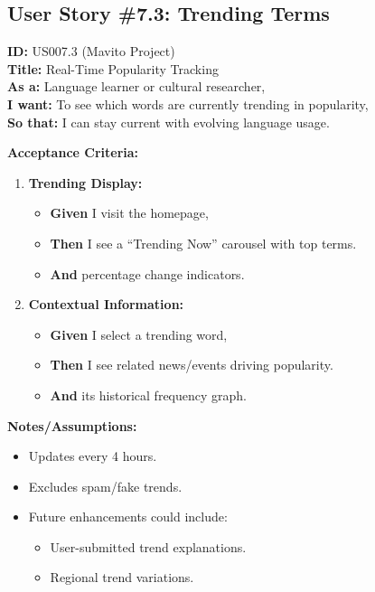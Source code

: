 \documentclass[12pt]{article}
\begin{document}
\subsection{User Story \#7.3: Trending Terms}

\textbf{ID:} US007.3 (Mavito Project) \\
\textbf{Title:} Real-Time Popularity Tracking \\
\textbf{As a:} Language learner or cultural researcher, \\
\textbf{I want:} To see which words are currently trending in popularity, \\
\textbf{So that:} I can stay current with evolving language usage.

\vspace{1em}
\textbf{Acceptance Criteria:}
\begin{enumerate}
    \item \textbf{Trending Display:}
    \begin{itemize}
        \item \textbf{Given} I visit the homepage,
        \item \textbf{Then} I see a ``Trending Now'' carousel with top terms.
        \item \textbf{And} percentage change indicators.
    \end{itemize}

    \item \textbf{Contextual Information:}
    \begin{itemize}
        \item \textbf{Given} I select a trending word,
        \item \textbf{Then} I see related news/events driving popularity.
        \item \textbf{And} its historical frequency graph.
    \end{itemize}
\end{enumerate}

\vspace{1em}
\textbf{Notes/Assumptions:}
\begin{itemize}
    \item Updates every 4 hours.
    \item Excludes spam/fake trends.
    \item Future enhancements could include:
    \begin{itemize}
        \item User-submitted trend explanations.
        \item Regional trend variations.
    \end{itemize}
\end{itemize}
\end{document}

